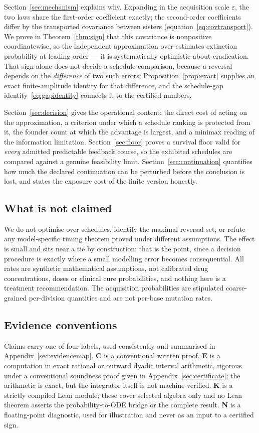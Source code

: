 \documentclass[11pt]{article}
\theoremstyle{remark}
\newcommand{\eps}{\varepsilon}
\begin{document}
Section~\ref{sec:mechanism} explains why. Expanding in the acquisition scale
$\eps$, the two laws share the first-order coefficient exactly; the second-order
coefficients differ by the transported covariance between sisters
(equation~\eqref{eq:covtransport}). We prove in Theorem~\ref{thm:sign} that this
covariance is nonpositive coordinatewise, so the independent approximation
over-estimates extinction probability at leading order --- it is systematically
optimistic about eradication. That sign alone does not decide a schedule
comparison, because a reversal depends on the \emph{difference} of two such
errors; Proposition~\ref{prop:exact} supplies an exact finite-amplitude identity
for that difference, and the schedule-gap identity~\eqref{eq:gapidentity}
connects it to the certified numbers.

Section~\ref{sec:decision} gives the operational content: the direct cost of
acting on the approximation, a criterion under which a schedule ranking is
protected from it, the founder count at which the advantage is largest, and a
minimax reading of the information limitation. Section~\ref{sec:floor} proves a
survival floor valid for \emph{every} admitted predictable feedback course, so
the exhibited schedules are compared against a genuine feasibility limit.
Section~\ref{sec:continuation} quantifies how much the declared continuation can
be perturbed before the conclusion is lost, and states the exposure cost of the
finite version honestly.

\subsection{What is not claimed}
We do not optimise over schedules, identify the maximal reversal set, or refute
any model-specific timing theorem proved under different assumptions. The effect
is small and sits near a tie by construction: that is the point, since a decision
procedure is exactly where a small modelling error becomes consequential. All
rates are synthetic mathematical assumptions, not calibrated drug
concentrations, doses or clinical cure probabilities, and nothing here is a
treatment recommendation. The acquisition probabilities are stipulated
coarse-grained per-division quantities and are not per-base mutation rates.

\subsection{Evidence conventions}\label{sec:evidence}
Claims carry one of four labels, used consistently and summarised in
Appendix~\ref{sec:evidencemap}. \textbf{C} is a conventional written proof.
\textbf{E} is a computation in exact rational or outward dyadic interval
arithmetic, rigorous under a conventional soundness proof given in
Appendix~\ref{sec:certificate}; the arithmetic is exact, but the integrator
itself is not machine-verified. \textbf{K} is a strictly compiled Lean module;
these cover selected algebra only and no Lean theorem asserts the
probability-to-ODE bridge or the complete result. \textbf{N} is a floating-point
diagnostic, used for illustration and never as an input to a certified sign.
\end{document}
